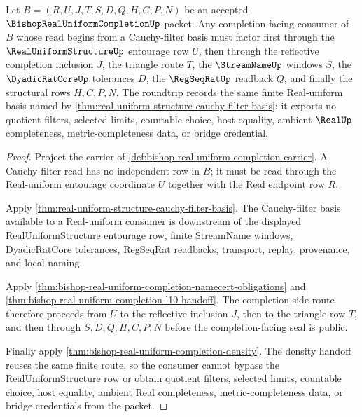 \begin{theorem}
\label{thm:bishop-real-uniform-completion-uniform-filter-roundtrip}
Let $B=(R,U,J,T,S,D,Q,H,C,P,N)$ be an accepted $\BishopRealUniformCompletionUp$ packet. Any completion-facing consumer of $B$ whose read begins from a Cauchy-filter basis must factor first through the $\RealUniformStructureUp$ entourage row $U$, then through the reflective completion inclusion $J$, the triangle route $T$, the $\StreamNameUp$ windows $S$, the $\DyadicRatCoreUp$ tolerances $D$, the $\RegSeqRatUp$ readback $Q$, and finally the structural rows $H,C,P,N$. The roundtrip records the same finite Real-uniform basis named by \autoref{thm:real-uniform-structure-cauchy-filter-basis}; it exports no quotient filters, selected limits, countable choice, host equality, ambient $\RealUp$ completeness, metric-completeness data, or bridge credential.
\end{theorem}
\begin{proof}
Project the carrier of \autoref{def:bishop-real-uniform-completion-carrier}. A Cauchy-filter read has no independent row in $B$; it must be read through the Real-uniform entourage coordinate $U$ together with the Real endpoint row $R$.

Apply \autoref{thm:real-uniform-structure-cauchy-filter-basis}. The Cauchy-filter basis available to a Real-uniform consumer is downstream of the displayed RealUniformStructure entourage row, finite StreamName windows, DyadicRatCore tolerances, RegSeqRat readbacks, transport, replay, provenance, and local naming.

Apply \autoref{thm:bishop-real-uniform-completion-namecert-obligations} and \autoref{thm:bishop-real-uniform-completion-l10-handoff}. The completion-side route therefore proceeds from $U$ to the reflective inclusion $J$, then to the triangle row $T$, and then through $S,D,Q,H,C,P,N$ before the completion-facing seal is public.

Finally apply \autoref{thm:bishop-real-uniform-completion-density}. The density handoff reuses the same finite route, so the consumer cannot bypass the RealUniformStructure row or obtain quotient filters, selected limits, countable choice, host equality, ambient Real completeness, metric-completeness data, or bridge credentials from the packet.
\end{proof}

